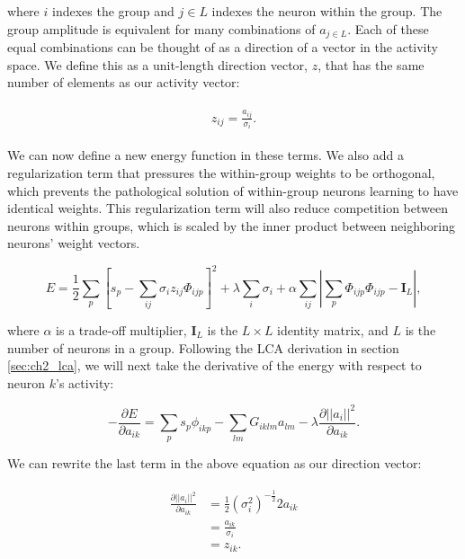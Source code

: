 \noindent where $i$ indexes the group and $j \in L$ indexes the neuron within the group. The group amplitude is equivalent for many combinations of $a_{j \in L}$. Each of these equal combinations can be thought of as a direction of a vector in the activity space. We define this as a unit-length direction vector, $z$, that has the same number of elements as our activity vector:

\begin{align}\label{eq:ch3_z_def}
\begin{split}
  z_{ij} = \frac{a_{ij}}{\sigma_{i}}.
\end{split}
\end{align}

We can now define a new energy function in these terms. We also add a regularization term that pressures the within-group weights to be orthogonal, which prevents the pathological solution of within-group neurons learning to have identical weights. This regularization term will also reduce competition between neurons within groups, which is scaled by the inner product between neighboring neurons' weight vectors.

\begin{equation}\label{eq:ch3_subspace_lca_energy}
    E = \frac{1}{2}\sum_{p}\left[s_{p} - \sum_{ij}\sigma_{i}z_{ij}\Phi_{ijp}\right]^{2} + \lambda \sum_{i}\sigma_{i} + \alpha \sum_{ij}\left|\sum_{p} \Phi_{ijp}\Phi_{ijp} - \mathbf{I}_{L} \right|,
\end{equation}

\noindent where $\alpha$ is a trade-off multiplier, $\mathbf{I}_{L}$ is the $L \times L$ identity matrix, and $L$ is the number of neurons in a group. Following the LCA derivation in section \ref{sec:ch2_lca}, we will next take the derivative of the energy with respect to neuron $k$'s activity:

\begin{equation}\label{eq:ch3_subspace_deda}
    -\frac{\partial E}{\partial a_{ik}} = \sum_{p}s_{p}\phi_{ikp} - \sum_{lm}G_{iklm}a_{lm} - \lambda \frac{\partial ||a_{i}||^{2}}{\partial a_{ik}}.
\end{equation}

We can rewrite the last term in the above equation as our direction vector:

\begin{align}\label{eq:ch3_subspace_deda_to_z}
\begin{split}
    \frac{\partial ||a_{i}||^{2}}{\partial a_{ik}} &= \frac{1}{2}\left(\sigma_{i}^{2}\right)^{-\tfrac{1}{2}}2a_{ik}\\
    &= \frac{a_{ik}}{\sigma_{i}}\\
    &= z_{ik}.
\end{split}
\end{align}

